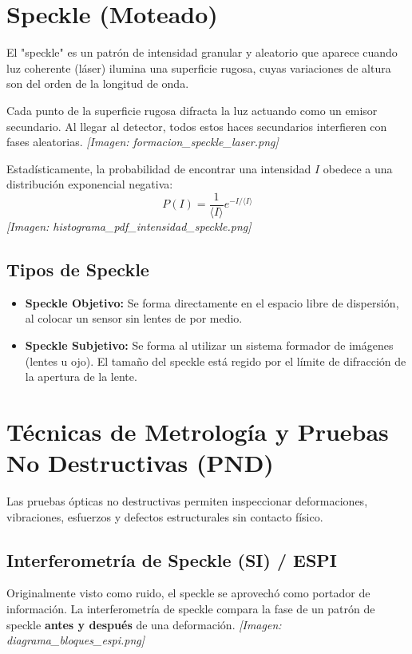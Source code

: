 \documentclass[12pt]{article}
\begin{document}
	\section{Speckle (Moteado)}
	El "speckle" es un patrón de intensidad granular y aleatorio que aparece cuando luz coherente (láser) ilumina una superficie rugosa, cuyas variaciones de altura son del orden de la longitud de onda. 
	
	Cada punto de la superficie rugosa difracta la luz actuando como un emisor secundario. Al llegar al detector, todos estos haces secundarios interfieren con fases aleatorias.
	\textit{[Imagen: formacion\_speckle\_laser.png]}
	
	Estadísticamente, la probabilidad de encontrar una intensidad $I$ obedece a una distribución exponencial negativa:
	\begin{equation*}
		P(I) = \frac{1}{\langle I \rangle} e^{-I / \langle I \rangle}
	\end{equation*}
	\textit{[Imagen: histograma\_pdf\_intensidad\_speckle.png]}
	
	\subsection{Tipos de Speckle}
	\begin{itemize}
		\item \textbf{Speckle Objetivo:} Se forma directamente en el espacio libre de dispersión, al colocar un sensor sin lentes de por medio.
		\item \textbf{Speckle Subjetivo:} Se forma al utilizar un sistema formador de imágenes (lentes u ojo). El tamaño del speckle está regido por el límite de difracción de la apertura de la lente.
	\end{itemize}
	
	\section{Técnicas de Metrología y Pruebas No Destructivas (PND)}
	Las pruebas ópticas no destructivas permiten inspeccionar deformaciones, vibraciones, esfuerzos y defectos estructurales sin contacto físico.
	
	\subsection{Interferometría de Speckle (SI) / ESPI}
	Originalmente visto como ruido, el speckle se aprovechó como portador de información. La interferometría de speckle compara la fase de un patrón de speckle \textbf{antes y después} de una deformación.
	\textit{[Imagen: diagrama\_bloques\_espi.png]}
	
\end{document}
